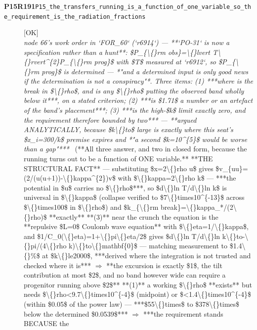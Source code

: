 \begin{description}
\item[\textbf{P15R191}\quad\texttt{P15\_the\_transfers\_running\_is\_a\_function\_of\_one\_variable\_so\_the\_requirement\_is\_the\_radiation\_fractions}]\hfill\textsf{[OK]}\\
\textit{node 66's work order in `FOR\_60` (`r6914`) --- **`PO-31` is now a specification rather than a hunt**: \$P\_\{\textbackslash\{\}rm obs\}=\textbackslash\{\}lvert T\textbackslash\{\}rvert\textasciicircum{}\{2\}P\_\{\textbackslash\{\}rm prog\}\$ with \$T\$ measured at `r6912`, so \$P\_\{\textbackslash\{\}rm prog\}\$ is determined --- *"and a determined input is only good news if the determination is not a conspiracy"*. Three items: (1) ***where is the break in \$\textbackslash\{\}rho\$, and is any \$\textbackslash\{\}rho\$ putting the observed band wholly below it***, on a stated criterion; (2) ***is \$1.71\$ a number or an artefact of the band's placement***; (3) ***is the high-\$k\$ limit exactly zero, and the requirement therefore bounded by two*** ---  **argued ANALYTICALLY, because \$k\textbackslash\{\}to\$ large is exactly where this seat's \$x\_i=300/k\$ premise expires and *"a second \$k=10\textasciicircum{}\{5\}\$ would be worse than a gap"***} \ (**All three answer, and two in closed form, because the running turns out to be a function of ONE variable.**  **THE STRUCTURAL FACT** --- substituting \$x=2\textbackslash\{\}rho u\$ gives \$v\_\{uu\}=(2/(u(u+1))-\textbackslash\{\}kappa\textasciicircum{}\{2\})v\$ with \$\textbackslash\{\}kappa=2\textbackslash\{\}rho k\$ --- ***the potential in \$u\$ carries no \$\textbackslash\{\}rho\$***, so \$d\textbackslash\{\}ln T/d\textbackslash\{\}ln k\$ is universal in \$\textbackslash\{\}kappa\$ (collapse verified to \$7\textbackslash\{\}times10\textasciicircum{}\{-13\}\$ across \$\textbackslash\{\}times100\$ in \$\textbackslash\{\}rho\$) and \$k\_\{\textbackslash\{\}rm break\}=\textbackslash\{\}kappa\_*/(2\textbackslash\{\}rho)\$ **exactly**  **(3)** near the crunch the equation is the **repulsive \$L=0\$ Coulomb wave equation** with \$\textbackslash\{\}eta=1/\textbackslash\{\}kappa\$, and \$1/C\_0(\textbackslash\{\}eta)=1+\textbackslash\{\}pi\textbackslash\{\}eta/2\$ gives \$d\textbackslash\{\}ln T/d\textbackslash\{\}ln k\textbackslash\{\}to-\textbackslash\{\}pi/(4\textbackslash\{\}rho k)\textbackslash\{\}to\textbackslash\{\}mathbf\{0\}\$ --- matching measurement to \$1.4\textbackslash\{\}\%\$ at \$k\textbackslash\{\}le2000\$, ***derived where the integration is not trusted and checked where it is*** \ensuremath{\Rightarrow}  **the excursion is exactly \$1\$, the tilt contribution at most \$2\$, and no band however wide can require a progenitor running above \$2\$**  **(1)** a working \$\textbackslash\{\}rho\$ **exists** but needs \$\textbackslash\{\}rho<9.7\textbackslash\{\}times10\textasciicircum{}\{-4\}\$ (midpoint) or \$<1.4\textbackslash\{\}times10\textasciicircum{}\{-4\}\$ (within \$0.05\$ of the power law) --- ***\$55\textbackslash\{\}times\$ to \$378\textbackslash\{\}times\$ below the determined \$0.0539\$*** \ensuremath{\Rightarrow}  ***the requirement stands BECAUSE the 
\end{description}
